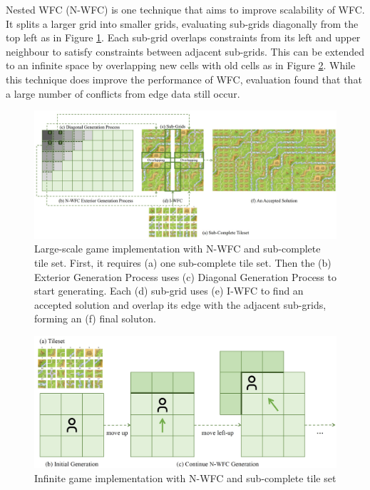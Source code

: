 Nested WFC (N-WFC) \cite{Nested_WFC} is one technique that aims to improve scalability of WFC. It splits a larger grid into smaller grids, evaluating sub-grids diagonally from the top left as in Figure \ref{fig:nestedWFC}. Each sub-grid overlaps constraints from its left and upper neighbour to satisfy constraints between adjacent sub-grids. This can be extended to an infinite space by overlapping new cells with old cells as in Figure \ref{fig:infiniteWFC}. While this technique does improve the performance of WFC, evaluation found that that a large number of conflicts from edge data still occur.

\begin{figure}[H]
        \centering
        \includegraphics[width=\textwidth, height=0.3\textheight, keepaspectratio]{Images/NestedWFC.jpg}
        \caption{Large-scale game implementation with N-WFC and sub-complete tile set. First, it requires (a) one sub-complete tile set. Then the (b) Exterior Generation Process uses (c) Diagonal Generation Process to start generating. Each (d) sub-grid uses (e) I-WFC to find an accepted solution and overlap its edge with the adjacent sub-grids, forming an (f) final soluton. \cite{Nested_WFC}}
        \label{fig:nestedWFC}
\end{figure}

\begin{figure}[H]
        \centering
        \includegraphics[width=\textwidth, height=0.3\textheight, keepaspectratio]{Images/InfiniteWFC.jpg}
        \caption{Infinite game implementation with N-WFC and sub-complete tile set \cite{Nested_WFC}}
        \label{fig:infiniteWFC}
\end{figure}

